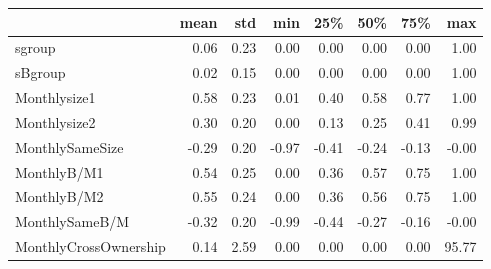 \begin{tabular}{lrrrrrrr}
\toprule
{} &  mean &   std &   min &   25\% &   50\% &   75\% &    max \\
\midrule
sgroup                &  0.06 &  0.23 &  0.00 &  0.00 &  0.00 &  0.00 &   1.00 \\
sBgroup               &  0.02 &  0.15 &  0.00 &  0.00 &  0.00 &  0.00 &   1.00 \\
Monthlysize1          &  0.58 &  0.23 &  0.01 &  0.40 &  0.58 &  0.77 &   1.00 \\
Monthlysize2          &  0.30 &  0.20 &  0.00 &  0.13 &  0.25 &  0.41 &   0.99 \\
MonthlySameSize       & -0.29 &  0.20 & -0.97 & -0.41 & -0.24 & -0.13 &  -0.00 \\
MonthlyB/M1           &  0.54 &  0.25 &  0.00 &  0.36 &  0.57 &  0.75 &   1.00 \\
MonthlyB/M2           &  0.55 &  0.24 &  0.00 &  0.36 &  0.56 &  0.75 &   1.00 \\
MonthlySameB/M        & -0.32 &  0.20 & -0.99 & -0.44 & -0.27 & -0.16 &  -0.00 \\
MonthlyCrossOwnership &  0.14 &  2.59 &  0.00 &  0.00 &  0.00 &  0.00 &  95.77 \\
\bottomrule
\end{tabular}
